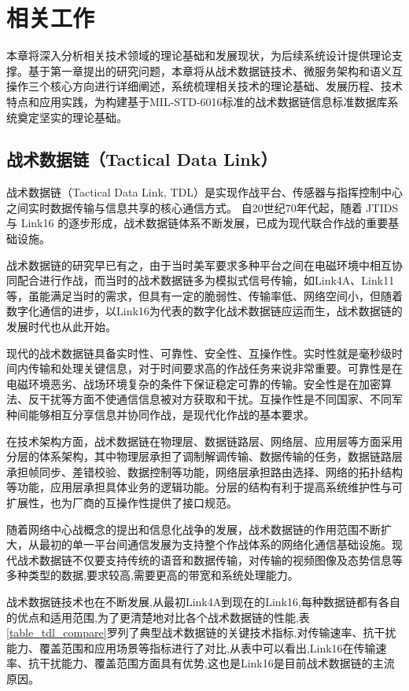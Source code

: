 \chapter{相关工作}

本章将深入分析相关技术领域的理论基础和发展现状，为后续系统设计提供理论支撑。基于第一章提出的研究问题，本章将从战术数据链技术、微服务架构和语义互操作三个核心方向进行详细阐述，系统梳理相关技术的理论基础、发展历程、技术特点和应用实践，为构建基于MIL-STD-6016标准的战术数据链信息标准数据库系统奠定坚实的理论基础。

\section{战术数据链（Tactical Data Link）}
战术数据链（Tactical Data Link, TDL）是实现作战平台、传感器与指挥控制中心之间实时数据传输与信息共享的核心通信方式\cite{AFMAN_13_116_Vol1_2020,EverythingRF_Link16_Band}。  
自20世纪70年代起，随着 {JTIDS} 与 {Link16} 的逐步形成，战术数据链体系不断发展，已成为现代联合作战的重要基础设施\cite{DLS_MIDS_JTRS_2021,BAE_Link16_Terminals_2025}。

战术数据链的研究早已有之，由于当时美军要求多种平台之间在电磁环境中相互协同配合进行作战，而当时的战术数据链多为模拟式信号传输，如Link4A、Link11等，虽能满足当时的需求，但具有一定的脆弱性、传输率低、网络空间小，但随着数字化通信的进步，以Link16为代表的数字化战术数据链应运而生，战术数据链的发展时代也从此开始。

现代的战术数据链具备实时性、可靠性、安全性、互操作性。实时性就是毫秒级时间内传输和处理关键信息，对于时间要求高的作战任务来说非常重要。可靠性是在电磁环境恶劣、战场环境复杂的条件下保证稳定可靠的传输。安全性是在加密算法、反干扰等方面不使通信信息被对方获取和干扰。互操作性是不同国家、不同军种间能够相互分享信息并协同作战，是现代化作战的基本要求。

在技术架构方面，战术数据链在物理层、数据链路层、网络层、应用层等方面采用分层的体系架构，其中物理层承担了调制解调传输、数据传输的任务，数据链路层承担帧同步、差错校验、数据控制等功能，网络层承担路由选择、网络的拓扑结构等功能，应用层承担具体业务的逻辑功能。分层的结构有利于提高系统维护性与可扩展性，也为厂商的互操作性提供了接口规范。

随着网络中心战概念的提出和信息化战争的发展，战术数据链的作用范围不断扩大，从最初的单一平台间通信发展为支持整个作战体系的网络化通信基础设施。现代战术数据链不仅要支持传统的语音和数据传输，对传输的视频图像及态势信息等多种类型的数据,要求较高,需要更高的带宽和系统处理能力。

战术数据链技术也在不断发展,从最初Link4A到现在的Link16,每种数据链都有各自的优点和适用范围,为了更清楚地对比各个战术数据链的性能,表\ref{table_tdl_compare}罗列了典型战术数据链的关键技术指标,对传输速率、抗干扰能力、覆盖范围和应用场景等指标进行了对比,从表中可以看出,Link16在传输速率、抗干扰能力、覆盖范围方面具有优势,这也是Link16是目前战术数据链的主流原因。


